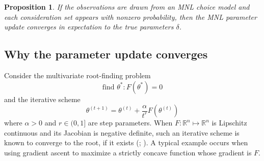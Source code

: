 \documentclass[preprint,12pt,authoryear]{elsarticle}
\newtheorem{proposition}{Proposition}
\begin{document}
\begin{proposition}If the observations are drawn from an MNL choice model and each consideration set appears with nonzero probability, then the MNL parameter update converges in expectation to the true parameters $\delta$.
\end{proposition}


\subsection{Why the parameter update converges}
Consider the multivariate root-finding problem \[\text{find } \theta^*: F(\theta^*) = 0\]
and the iterative scheme \[\theta^{(t+1)} = \theta^{(t)} + \frac{\alpha}{t^r} F\left(\theta^{(t)} \right)\]
where $\alpha >0$ and $r \in (0, 1]$ are step parameters. When $F: \mathbb{R}^n \mapsto \mathbb{R}^n$ is Lipschitz continuous and its Jacobian is negative definite, such an iterative scheme is known to converge to the root, if it exists (\citealp[][Theorem 11.6]{nocedal2006}; \citealp[][Proposition 1.2.4]{bertsekas1999}). A typical example occurs when using gradient ascent to maximize a strictly concave function whose gradient is $F$.
\end{document}
